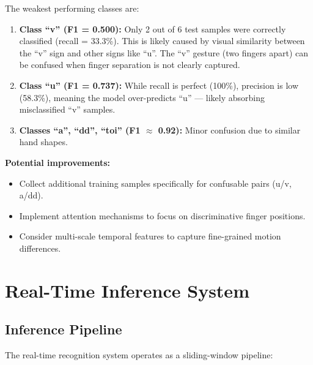 \documentclass[12pt, a4paper]{article}
\begin{document}
The weakest performing classes are:

\begin{enumerate}
    \item \textbf{Class ``v'' (F1 = 0.500):} Only 2 out of 6 test samples were correctly classified (recall = 33.3\%). This is likely caused by visual similarity between the ``v'' sign and other signs like ``u''. The ``v'' gesture (two fingers apart) can be confused when finger separation is not clearly captured.

    \item \textbf{Class ``u'' (F1 = 0.737):} While recall is perfect (100\%), precision is low (58.3\%), meaning the model over-predicts ``u'' — likely absorbing misclassified ``v'' samples.

    \item \textbf{Classes ``a'', ``dd'', ``toi'' (F1 $\approx$ 0.92):} Minor confusion due to similar hand shapes.
\end{enumerate}

\textbf{Potential improvements:}
\begin{itemize}
    \item Collect additional training samples specifically for confusable pairs (u/v, a/dd).
    \item Implement attention mechanisms to focus on discriminative finger positions.
    \item Consider multi-scale temporal features to capture fine-grained motion differences.
\end{itemize}

\section{Real-Time Inference System}
\label{sec:realtime}

\subsection{Inference Pipeline}

The real-time recognition system operates as a sliding-window pipeline:
\end{document}
